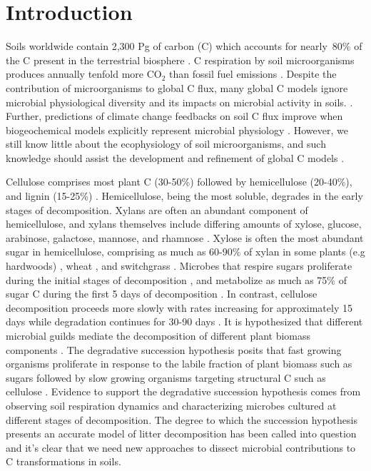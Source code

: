 \section{Introduction}
Soils worldwide contain 2,300 Pg of carbon (C) which accounts for nearly~80\%
of the C present in the terrestrial biosphere
\citep{Amundson_2001,BATJES_1996}. C respiration by soil microorganisms
produces annually tenfold more CO$_{2}$ than fossil fuel emissions
\citep{chapin2002principles}. Despite the contribution of microorganisms to
global C flux, many global C models ignore microbial physiological diversity
and its impacts on microbial activity in soils.
\citep{Allison2010,Six2006,Treseder2011}. Further, predictions of climate
change feedbacks on soil C flux improve when biogeochemical models explicitly
represent microbial physiology \citep{Wieder2013}. However, we still know
little about the ecophysiology of soil microorganisms, and such knowledge
should assist the development and refinement of global C models
\citep{Bradford2008,Neff_2001,McGuire2010}.

Cellulose comprises most plant C (30-50\%) followed by hemicellulose (20-40\%),
and lignin (15-25\%) \citep{Lynd2002}. Hemicellulose, being the most soluble,
degrades in the early stages of decomposition. Xylans are often an abundant
component of hemicellulose, and xylans themselves include differing amounts of
xylose, glucose, arabinose, galactose, mannose, and rhamnose \citep{Saha2003}.
Xylose is often the most abundant sugar in hemicellulose, comprising as much as
60-90\% of xylan in some plants (e.g hardwoods) \citep{Spiridon2008}, wheat
\citep{Sun2005}, and switchgrass \citep{Bunnell2013}. Microbes that respire
sugars proliferate during the initial stages of decomposition
\citep{Garrett1951,Alexander1964}, and metabolize as much as 75\% of sugar
C during the first 5 days of decomposition \citep{Engelking2007}. In contrast,
cellulose decomposition proceeds more slowly with rates increasing for
approximately 15 days while degradation continues for 30-90 days
\citep{Hu1997,Engelking2007}. It is hypothesized that different microbial
guilds mediate the decomposition of different plant biomass components
\citep{Hu1997,Rui2009,AnneliseHKjoller2002,Bastian_2009}. The degradative
succession hypothesis posits that fast growing organisms proliferate in
response to the labile fraction of plant biomass such as sugars
\citep{Garrett1963,Bremer1994} followed by slow growing organisms targeting
structural C such as cellulose \citep{Garrett1963}. Evidence to support the
degradative succession hypothesis comes from observing soil respiration
dynamics and characterizing microbes cultured at different stages of
decomposition. The degree to which the succession hypothesis presents an
accurate model of litter decomposition has been called into question
\citep{AnneliseHKjoller2002,Frankland_1998,Osono_2005} and it's clear that
we need new approaches to dissect microbial contributions to
C transformations in soils.

